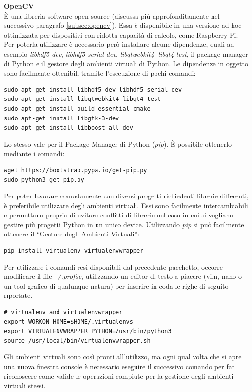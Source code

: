 \documentclass[12pt]{article}
\newcommand{\quotes}[1]{``#1''}
\begin{document}
\vspace{0.5cm}
\textbf{OpenCV}\\
È una libreria software open source (discussa più approfonditamente nel successivo paragrafo \ref{subsec:opencv}).
Essa è disponibile in una versione ad hoc ottimizzata per dispositivi con ridotta capacità di calcolo, come Raspberry Pi. Per poterla utilizzare è necessario però installare alcune dipendenze, quali ad esempio \textit{libhdf5-dev}, \textit{libhdf5-serial-dev}, \textit{libqtwebkit4}, \textit{libqt4-test}, il package manager di Python e il gestore degli ambienti virtuali di Python. Le dipendenze in oggetto sono facilmente ottenibili tramite l'esecuzione di pochi comandi:
\begin{lstlisting}
sudo apt-get install libhdf5-dev libhdf5-serial-dev
sudo apt-get install libqtwebkit4 libqt4-test
sudo apt-get install build-essential cmake
sudo apt-get install libgtk-3-dev
sudo apt-get install libboost-all-dev
\end{lstlisting}
Lo stesso vale per il Package Manager di Python (\textit{pip}). È possibile ottenerlo mediante i comandi:
\begin{lstlisting}
wget https://bootstrap.pypa.io/get-pip.py
sudo python3 get-pip.py
\end{lstlisting}
Per poter lavorare comodamente con diversi progetti richiedenti librerie differenti, è preferibile utilizzare degli ambienti virtuali. Essi sono facilmente intercambiabili e permettono proprio di evitare conflitti di librerie nel caso in cui si vogliano gestire più progetti Python in un unico device. Utilizzando \textit{pip} si può facilmente ottenere il \quotes{Gestore degli Ambienti Virtuali}:
\begin{lstlisting}
pip install virtualenv virtualenvwrapper
\end{lstlisting}
Per utilizzare i comandi resi disponibili dal precedente pacchetto, occorre modificare il file \textit{~/.profile}, utilizzando un editor di testo a piacere (vim, nano o un tool grafico di qualunque natura) per inserire in coda le righe di seguito riportate.
\begin{lstlisting}
# virtualenv and virtualenvwrapper
export WORKON_HOME=$HOME/.virtualenvs
export VIRTUALENVWRAPPER_PYTHON=/usr/bin/python3
source /usr/local/bin/virtualenvwrapper.sh
\end{lstlisting}
Gli ambienti virtuali sono così pronti all'utilizzo, ma ogni qual volta che si apre una nuova finestra console è necessario eseguire il successivo comando per far riconoscere come valide le operazioni compiute per la gestione degli ambienti virtuali stessi.
\end{document}
